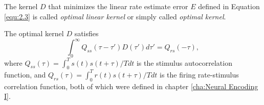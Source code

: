 \begin{defn}
  \label{def:optimalKernel}
  The kernel $D$ that minimizes the linear rate estimate error $E$ defined in Equation \ref{equ:2.3} is called \emph{optimal linear kernel} or simply called \emph{optimal kernel}.
\end{defn}

\begin{prop}
  \label{prop:OptimalLinearKernel}
  The optimal kernel $D$ satisfies
  \begin{equation}
    \label{equ:2.4}
    \int_0^{\infty}Q_{ss}(\tau-\tau')D(\tau')d\tau' = Q_{rs}(-\tau),
  \end{equation}
  where $Q_{ss}(\tau) = \int_0^T s(t)s(t+\tau)/T dt$ is the stimulus autocorrelation function, and $Q_{rs}(\tau) = \int_0^T r(t) s(t+\tau)/T dt$ is the firing rate-stimulus correlation function, both of which were defined in chapter \ref{cha:Neural Encoding I}.
\end{prop}
